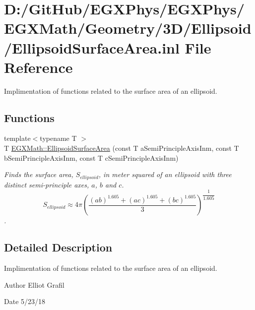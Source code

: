 \hypertarget{_ellipsoid_surface_area_8inl}{}\section{D\+:/\+Git\+Hub/\+E\+G\+X\+Phys/\+E\+G\+X\+Phys/\+E\+G\+X\+Math/\+Geometry/3\+D/\+Ellipsoid/\+Ellipsoid\+Surface\+Area.inl File Reference}
\label{_ellipsoid_surface_area_8inl}


Implimentation of functions related to the surface area of an ellipsoid.  


\subsection*{Functions}
\begin{DoxyCompactItemize}
\item 
{\footnotesize template$<$typename T $>$ }\\T \mbox{\hyperlink{group___e_g_x_math-_geometry-3_d-_ellipsoid-_surface_area_gae1dfe0a51a3adc5121de3ced76b4068c}{E\+G\+X\+Math\+::\+Ellipsoid\+Surface\+Area}} (const T a\+Semi\+Principle\+Axis\+Inm, const T b\+Semi\+Principle\+Axis\+Inm, const T c\+Semi\+Principle\+Axis\+Inm)
\begin{DoxyCompactList}\small\item\em Finds the surface area, $S_{ellipsoid}$, in meter squared of an ellipsoid with three distinct semi-\/principle axes, $a$, $b$ and $c$. \[ S_{ellipsoid} \approx 4 \pi \left ( \dfrac{(ab)^{1.605}+(ac)^{1.605}+(bc)^{1.605}}{3} \right )^{\dfrac{1}{1.605}} \]. \end{DoxyCompactList}\end{DoxyCompactItemize}


\subsection{Detailed Description}
Implimentation of functions related to the surface area of an ellipsoid. 

\begin{DoxyAuthor}{Author}
Elliot Grafil 
\end{DoxyAuthor}
\begin{DoxyDate}{Date}
5/23/18 
\end{DoxyDate}
